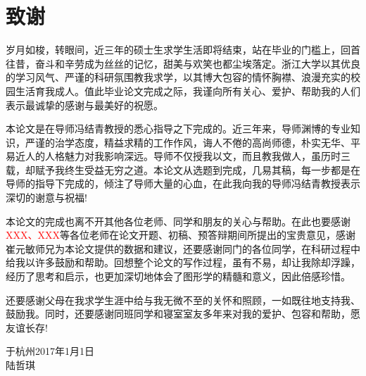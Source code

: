 \chapter{致\texorpdfstring{\ZJUspace}{}谢}
岁月如梭，转眼间，近三年的硕士生求学生活即将结束，站在毕业的门槛上，回首往昔，奋斗和辛劳成为丝丝的记忆，甜美与欢笑也都尘埃落定。浙江大学以其优良的学习风气、严谨的科研氛围教我求学，以其博大包容的情怀胸襟、浪漫充实的校园生活育我成人。值此毕业论文完成之际，我谨向所有关心、爱护、帮助我的人们表示最诚挚的感谢与最美好的祝愿。

本论文是在导师冯结青教授的悉心指导之下完成的。近三年来，导师渊博的专业知识，严谨的治学态度，精益求精的工作作风，诲人不倦的高尚师德，朴实无华、平易近人的人格魅力对我影响深远。导师不仅授我以文，而且教我做人，虽历时三载，却赋予我终生受益无穷之道。本论文从选题到完成，几易其稿，每一步都是在导师的指导下完成的，倾注了导师大量的心血，在此我向我的导师冯结青教授表示深切的谢意与祝福!

本论文的完成也离不开其他各位老师、同学和朋友的关心与帮助。在此也要感谢\textcolor{red}{XXX、XXX}等各位老师在论文开题、初稿、预答辩期间所提出的宝贵意见，感谢崔元敏师兄为本论文提供的数据和建议，还要感谢同门的各位同学，在科研过程中给我以许多鼓励和帮助。回想整个论文的写作过程，虽有不易，却让我除却浮躁，经历了思考和启示，也更加深切地体会了图形学的精髓和意义，因此倍感珍惜。

还要感谢父母在我求学生涯中给与我无微不至的关怀和照顾，一如既往地支持我、鼓励我。同时，还要感谢同班同学和寝室室友多年来对我的爱护、包容和帮助，愿友谊长存!

\vspace{2cm}
\hfill
\begin{minipage}{14em}
\begin{center}
于杭州\quad 2017年1月1日\\
陆哲琪
\end{center}
\end{minipage}
